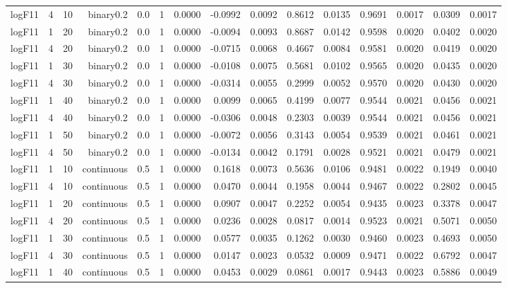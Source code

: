 \begin{longtable}{rrrrrrrrrrrrrrr}
  logF11 & 4 & 10 & binary0.2 & 0.0 & 1 & 0.0000 & -0.0992 & 0.0092 & 0.8612 & 0.0135 & 0.9691 & 0.0017 & 0.0309 & 0.0017 \\ 
  logF11 & 1 & 20 & binary0.2 & 0.0 & 1 & 0.0000 & -0.0094 & 0.0093 & 0.8687 & 0.0142 & 0.9598 & 0.0020 & 0.0402 & 0.0020 \\ 
  logF11 & 4 & 20 & binary0.2 & 0.0 & 1 & 0.0000 & -0.0715 & 0.0068 & 0.4667 & 0.0084 & 0.9581 & 0.0020 & 0.0419 & 0.0020 \\ 
  logF11 & 1 & 30 & binary0.2 & 0.0 & 1 & 0.0000 & -0.0108 & 0.0075 & 0.5681 & 0.0102 & 0.9565 & 0.0020 & 0.0435 & 0.0020 \\ 
  logF11 & 4 & 30 & binary0.2 & 0.0 & 1 & 0.0000 & -0.0314 & 0.0055 & 0.2999 & 0.0052 & 0.9570 & 0.0020 & 0.0430 & 0.0020 \\ 
  logF11 & 1 & 40 & binary0.2 & 0.0 & 1 & 0.0000 & 0.0099 & 0.0065 & 0.4199 & 0.0077 & 0.9544 & 0.0021 & 0.0456 & 0.0021 \\ 
  logF11 & 4 & 40 & binary0.2 & 0.0 & 1 & 0.0000 & -0.0306 & 0.0048 & 0.2303 & 0.0039 & 0.9544 & 0.0021 & 0.0456 & 0.0021 \\ 
  logF11 & 1 & 50 & binary0.2 & 0.0 & 1 & 0.0000 & -0.0072 & 0.0056 & 0.3143 & 0.0054 & 0.9539 & 0.0021 & 0.0461 & 0.0021 \\ 
  logF11 & 4 & 50 & binary0.2 & 0.0 & 1 & 0.0000 & -0.0134 & 0.0042 & 0.1791 & 0.0028 & 0.9521 & 0.0021 & 0.0479 & 0.0021 \\ 
  logF11 & 1 & 10 & continuous & 0.5 & 1 & 0.0000 & 0.1618 & 0.0073 & 0.5636 & 0.0106 & 0.9481 & 0.0022 & 0.1949 & 0.0040 \\ 
  logF11 & 4 & 10 & continuous & 0.5 & 1 & 0.0000 & 0.0470 & 0.0044 & 0.1958 & 0.0044 & 0.9467 & 0.0022 & 0.2802 & 0.0045 \\ 
  logF11 & 1 & 20 & continuous & 0.5 & 1 & 0.0000 & 0.0907 & 0.0047 & 0.2252 & 0.0054 & 0.9435 & 0.0023 & 0.3378 & 0.0047 \\ 
  logF11 & 4 & 20 & continuous & 0.5 & 1 & 0.0000 & 0.0236 & 0.0028 & 0.0817 & 0.0014 & 0.9523 & 0.0021 & 0.5071 & 0.0050 \\ 
  logF11 & 1 & 30 & continuous & 0.5 & 1 & 0.0000 & 0.0577 & 0.0035 & 0.1262 & 0.0030 & 0.9460 & 0.0023 & 0.4693 & 0.0050 \\ 
  logF11 & 4 & 30 & continuous & 0.5 & 1 & 0.0000 & 0.0147 & 0.0023 & 0.0532 & 0.0009 & 0.9471 & 0.0022 & 0.6792 & 0.0047 \\ 
  logF11 & 1 & 40 & continuous & 0.5 & 1 & 0.0000 & 0.0453 & 0.0029 & 0.0861 & 0.0017 & 0.9443 & 0.0023 & 0.5886 & 0.0049 \\ 

\end{longtable}
